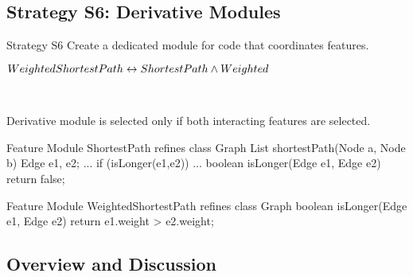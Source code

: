 \subsection{Strategy S6: Derivative Modules}

\begin{frame}{\myframetitle}
	\begin{mycolumns}[widths={30},animation=none]
		\begin{definition}{Strategy S6}
			Create a dedicated module for code that coordinates features.
		\end{definition}
	\mynextcolumn
	\end{mycolumns}
\end{frame}

\begin{frame}[fragile]{\myframetitle}
	\begin{mycolumns}[animation=none]
		\centering

		$WeightedShortestPath \leftrightarrow ShortestPath \wedge Weighted$

		~
		\begin{note}{}
			Derivative module is selected only if both interacting features are selected.
		\end{note}
	\mynextcolumn
\begin{codetight}{Feature Module ShortestPath}
refines class Graph {
	List shortestPath(Node a, Node b){
		Edge e1, e2;
		...
		if (isLonger(e1,e2)) 
		... 
	}
	boolean isLonger(Edge e1, Edge e2){
		return false;
	}
}
\end{codetight}	
\begin{codetight}{Feature Module WeightedShortestPath}
refines class Graph {
	boolean isLonger(Edge e1, Edge e2){
		return e1.weight > e2.weight;
	}
}
\end{codetight}	
	\end{mycolumns}
\end{frame}

\subsection{Overview and Discussion}

\begin{frame}[label=HandlingFeatureInteractions]{\myframetitle}
	\centering{} %
\end{frame}
